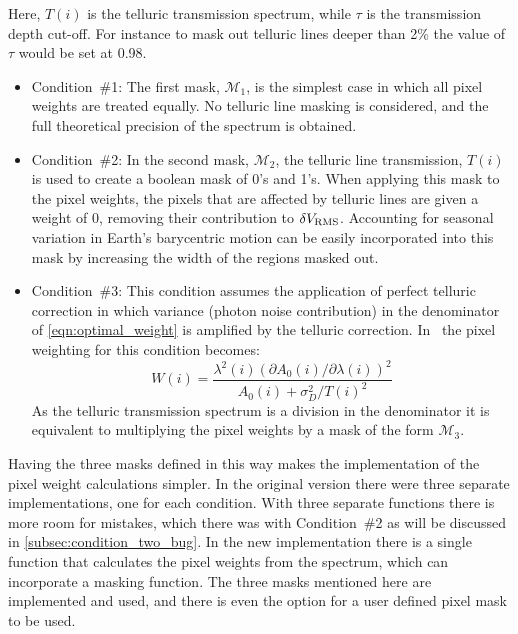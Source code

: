 Here, \(T(i)\) is the telluric transmission spectrum, while \(\tau\) is the transmission depth cut-off.
For instance to mask out telluric lines deeper than 2\% the value of \(\tau\) would be set at 0.98.

\begin{itemize}
    \setlength\itemsep{-0.2em} %
    \item Condition~\#1:
    The first mask, \({\mathcal{M}}_{1}\), is the simplest case in which all pixel weights are treated equally.
    No telluric line masking is considered, and the full theoretical precision of the spectrum is obtained.
    
    \item Condition~\#2:
    In the second mask, \({\mathcal{M}}_{2}\), the telluric line transmission, \(T(i)\) is used to create a boolean mask of 0's and 1's.
    When applying this mask to the pixel weights, the pixels that are affected by telluric lines are given a weight of 0, removing their contribution to \(\delta {V}_{\textrm{RMS}}\).
    Accounting for seasonal variation in Earth's barycentric motion can be easily incorporated into this mask by increasing the width of the regions masked out.
    
    \item Condition~\#3:
    This condition assumes the application of perfect telluric correction in which variance (photon noise contribution) in the denominator of \cref{eqn:optimal_weight} is amplified by the telluric correction.
    In~\citet{figueira_radial_2016} the pixel weighting for this condition becomes:
    \begin{equation}
    W(i) = \frac{{\lambda}^{2}(i) {({\partial {A}_{0}(i)}/{\partial \lambda(i)})}^{2}}{A_0(i) + {\sigma}^{2}_{D}/{T(i)}^{2}} \label{eqn:optimal_weight_transmission}
    \end{equation}
    As the telluric transmission spectrum is a division in the denominator it is equivalent to multiplying the pixel weights by a mask of the form \({\mathcal{M}}_{3}\).
\end{itemize}

Having the three masks defined in this way makes the implementation of the pixel weight calculations simpler.
In the original version there were three separate implementations, one for each condition.
With three separate functions there is more room for mistakes, which there was with Condition~\#2 as will be discussed in \cref{subsec:condition_two_bug}.
In the new implementation there is a single function that calculates the pixel weights from the spectrum, which can incorporate a masking function.
The three masks mentioned here are implemented and used, and there is even the option for a user defined pixel mask to be used.


